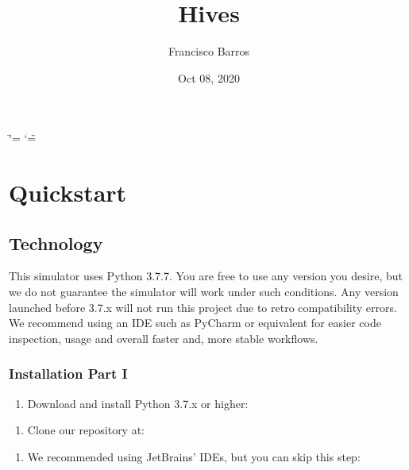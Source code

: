 \documentclass[letterpaper,10pt,english]{sphinxmanual}
\title{Hives}
\date{Oct 08, 2020}
\author{Francisco Barros}
\begin{document}
\ifdefined\shorthandoff
  \ifnum\catcode`\=\string=\active\shorthandoff{=}\fi
  \ifnum\catcode`\"=\active{}\fi
\fi

\pagestyle{empty}
\sphinxmaketitle
\pagestyle{plain}
\sphinxtableofcontents
\pagestyle{normal}
\label{\detokenize{index::doc}}



\chapter{Quickstart}
\label{\detokenize{quickstartdocs:quickstart}}\label{\detokenize{quickstartdocs::doc}}

\section{Technology}
\label{\detokenize{quickstartdocs:technology}}
This simulator uses Python 3.7.7. You are free to use any version you desire,
but we do not guarantee the simulator will work under such conditions.
Any version launched before 3.7.x will not run this project due to retro
compatibility errors. We recommend using an IDE such as PyCharm or equivalent
for easier code inspection, usage and overall faster and, more stable workflows.


\subsection{Installation \sphinxhyphen{} Part I}
\label{\detokenize{quickstartdocs:installation-part-i}}\begin{enumerate}
%
\item {} 
Download and install Python 3.7.x or higher:

\end{enumerate}

\begin{DUlineblock}{0em}
\item[] \sphinxhyphen{} 
\end{DUlineblock}
\begin{enumerate}
%
\setcounter{enumi}{1}
\item {} 
Clone our repository at:

\end{enumerate}

\begin{DUlineblock}{0em}
\item[] \sphinxhyphen{} 
\end{DUlineblock}
\begin{enumerate}
%
\setcounter{enumi}{2}
\item {} 
We recommended using JetBrains’ IDEs, but you can skip this step:

\end{enumerate}
\end{document}
